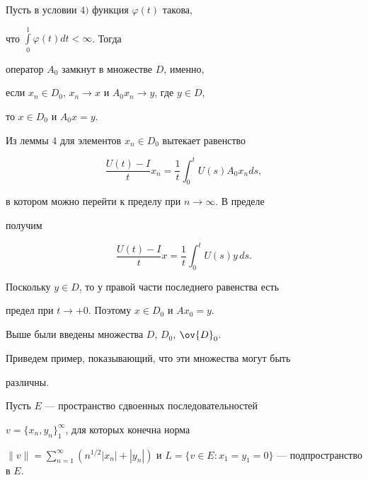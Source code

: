 \begin{lem}


Пусть в условии $4)$ функция $\varphi(t)$ такова,


что $\int\limits^{1}_{0} \varphi(t)dt < \infty$. Тогда


оператор $A_{0}$  замкнут в множестве $D$, именно,


если $x_{n}\in D_{0}$,  $x_{n}\to x$ и $A_{0}x_{n} \to y$, где $y\in D$,


то $x\in D_{0}$ и $A_{0}x=y$.


\end{lem}








\begin{pf}


Из леммы 4 для элементов $x_{n}\in D_{0}$ вытекает равенство


$$


\frac{U(t)-I}{t}x_{n}=\frac{1}{t}


\int^{t}_{0} U(s)A_{0}x_{n}ds,


$$


в котором можно перейти к пределу при $n\to\infty$. В пределе


получим


$$


\frac{U(t)-I}{t}x=\frac{1}{t}\int^{t}_{0} U(s)y\,ds.


$$


Поскольку $y\in D$, то у правой части последнего равенства есть


предел при $t\to +0$. Поэтому $x\in D_{0}$ и $Ax_{0}=y$.


\end{pf}





Выше были введены множества $D$, $D_{0}$, $\ov{D}_{0}$.


Приведем пример, показывающий, что эти множества могут быть


различны.





Пусть $E$ --- пространство сдвоенных последовательностей


$v=\{x_{n}, y_{n} \}^{\infty}_{1}$, для которых конечна норма


$\| v\|=\sum\limits^{\infty}_{n=1}(n^{1/2}|x_{n}|+


|y_{n}|)$ и $L= \{v\in E : x_{1}=y_{1}=0 \}$ --- подпространство в $E$.





